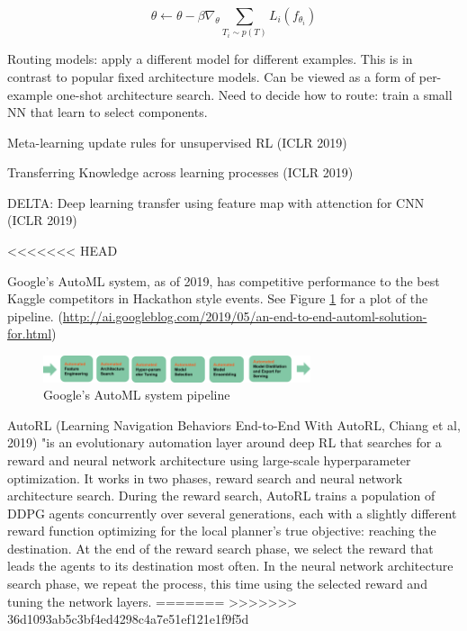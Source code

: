 \documentclass[english]{article}
\begin{document}
$$\theta  \gets 
\theta - \beta \nabla_\theta \sum_{T_i \sim p(T)} L_i(f_{\theta_i})
$$

\item Routing models: apply a different model for different examples. This is in contrast to popular fixed architecture models. Can be viewed as a form of per-example one-shot architecture search. Need to decide how to route: train a small NN that learn to select components. 

\item Meta-learning update rules for unsupervised RL (ICLR 2019)

Transferring Knowledge across learning processes (ICLR 2019)

DELTA: Deep learning transfer using feature map with attenction for CNN (ICLR 2019)

<<<<<<< HEAD
\item Google's AutoML system, as of 2019, has competitive performance to the best Kaggle competitors in Hackathon style events. See Figure \ref{automl} for a plot of the pipeline. (\url{http://ai.googleblog.com/2019/05/an-end-to-end-automl-solution-for.html})


\begin{figure}[h!]
  \centering
  \includegraphics[width=0.7\textwidth]{automl}
  \caption{Google's AutoML system pipeline}
  \label{automl}
\end{figure}

\item AutoRL (Learning Navigation Behaviors End-to-End With AutoRL, Chiang et al, 2019)
"is an evolutionary automation layer around deep RL that searches for a reward and neural network architecture using large-scale hyperparameter optimization. It works in two phases, reward search and neural network architecture search. During the reward search, AutoRL trains a population of DDPG agents concurrently over several generations, each with a slightly different reward function optimizing for the local planner’s true objective: reaching the destination. At the end of the reward search phase, we select the reward that leads the agents to its destination most often. In the neural network architecture search phase, we repeat the process, this time using the selected reward and tuning the network layers.
=======
>>>>>>> 36d1093ab5c3bf4ed4298c4a7e51ef121e1f9f5d

\eenum 
\end{document}
